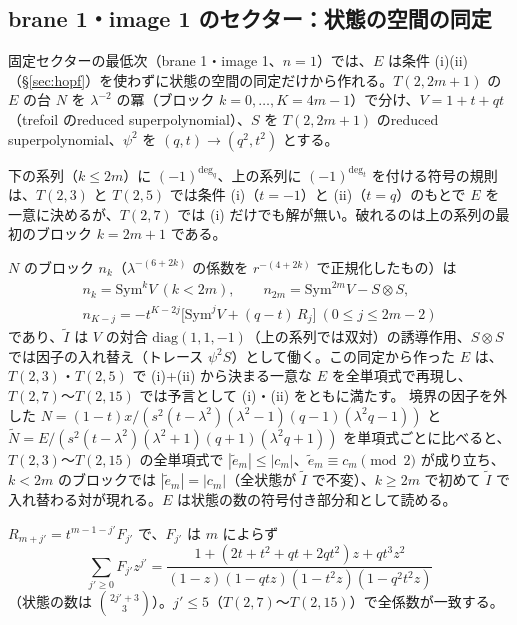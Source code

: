 \subsection{brane 1・image 1 のセクター：状態の空間の同定}\label{sec:principle}
固定セクターの最低次（brane 1・image 1、$n = 1$）では、$E$ は条件 (i)(ii)（§\ref{sec:hopf}）を使わずに状態の空間の同定だけから作れる。$T(2,2m+1)$ の $E$ の台 $N$ を $\lambda^{-2}$ の冪（ブロック $k = 0, \dots, K = 4m-1$）で分け、$V = 1 + t + qt$（trefoil のreduced superpolynomial）、$S$ を $T(2,2m+1)$ のreduced superpolynomial、$\psi^2$ を $(q, t)\to(q^2, t^2)$ とする。
\begin{compresult}[符号の規則の破れ]\label{cr:signrule}
下の系列（$k \le 2m$）に $(-1)^{\deg_q}$、上の系列に $(-1)^{\deg_t}$ を付ける符号の規則は、$T(2,3)$ と $T(2,5)$ では条件 (i)（$t = -1$）と (ii)（$t = q$）のもとで $E$ を一意に決めるが、$T(2,7)$ では (i) だけでも解が無い。破れるのは上の系列の最初のブロック $k = 2m+1$ である。
\end{compresult}
\begin{compresult}\label{cr:principle}
$N$ のブロック $n_k$（$\lambda^{-(6+2k)}$ の係数を $r^{-(4+2k)}$ で正規化したもの）は
\begin{gather*}
n_k = \mathrm{Sym}^k V \ (k < 2m),\qquad n_{2m} = \mathrm{Sym}^{2m}V - S\otimes S,\\
n_{K-j} = -t^{K-2j}\bigl[\mathrm{Sym}^j V + (q-t)\,R_j\bigr]\ (0 \le j \le 2m-2)
\end{gather*}
であり、$\tilde I$ は $V$ の対合 $\mathrm{diag}(1, 1, -1)$（上の系列では双対）の誘導作用、$S\otimes S$ では因子の入れ替え（トレース $\psi^2 S$）として働く。この同定から作った $E$ は、$T(2,3)$・$T(2,5)$ で (i)+(ii) から決まる一意な $E$ を全単項式で再現し、$T(2,7)$〜$T(2,15)$ では予言として (i)・(ii) をともに満たす。
境界の因子を外した $N = (1-t)x/(s^2(t-\lambda^2)(\lambda^2-1)(q-1)(\lambda^2q-1))$ と $\tilde N = E/(s^2(t-\lambda^2)(\lambda^2+1)(q+1)(\lambda^2q+1))$ を単項式ごとに比べると、$T(2,3)$〜$T(2,15)$ の全単項式で $|\tilde e_m| \le |c_m|$、$\tilde e_m \equiv c_m \pmod 2$ が成り立ち、$k < 2m$ のブロックでは $|\tilde e_m| = |c_m|$（全状態が $\tilde I$ で不変）、$k \ge 2m$ で初めて $\tilde I$ で入れ替わる対が現れる。$E$ は状態の数の符号付き部分和として読める。
\end{compresult}
\begin{conjecture}[補正の形]\label{conj:correction}
$R_{m+j'} = t^{m-1-j'}F_{j'}$ で、$F_{j'}$ は $m$ によらず
\[
\sum_{j'\ge 0}F_{j'}z^{j'} = \frac{1 + (2t + t^2 + qt + 2qt^2)z + qt^3z^2}{(1-z)(1-qtz)(1-t^2z)(1-q^2t^2z)}
\]
（状態の数は $\binom{2j'+3}{3}$）。$j' \le 5$（$T(2,7)$〜$T(2,15)$）で全係数が一致する。
\end{conjecture}
